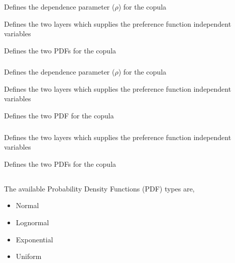 {Defines the dependence parameter ($\rho$) for the copula}

 {Defines the two layers which supplies the preference function independent variables}

 {Defines the two PDFs for the copula}

\subsubsection[Frank copula]{}

 {Defines the dependence parameter ($\rho$) for the copula}

 {Defines the two layers which supplies the preference function independent variables}

 {Defines the two PDF for the copula}

\subsubsection[Independence copula]{}

 {Defines the two layers which supplies the preference function independent variables}

 {Defines the two PDFs for the copula}

\subsection{}

The available Probability Density Functions (PDF) types are,

\begin{itemize}
	\item Normal
	\item Lognormal
	\item Exponential
	\item Uniform
\end{itemize}

